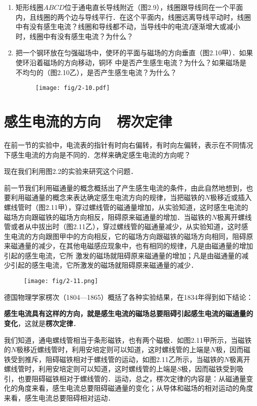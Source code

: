 \begin{enumerate}
    \item 矩形线圈$ABCD$位于通电直长导线附近（图2.9），线圈跟导线同在一个平面内，且线圈的两个边与导线平行．在这个平面内，线圈远离导线平动时，线圈中有没有感生电流？线圈和导线都不动，当导线中的电流$I$逐渐增大或减小时，线圈中有没有感生电流？为什么？
    \item 把一个钢环放在匀强磁场中，使环的平面与磁场的方向垂直（图2.10甲）．如果使环沿着磁场的方向移动，铜环
中是否产生感生电流？为什么？如果磁场是不均匀的（图2.10乙），是否产生感生电流？为什么？
\begin{figure}[htp]\centering
\texttt{[image: fig/2-10.pdf]}
\caption{}
\end{figure}
\end{enumerate}


\section{感生电流的方向~~楞次定律}
在前一节的实验中，电流表的指针有时向右偏转，有时向左偏转，表示在不同情况下感生电流的方向是不同的．怎样来确定感生电流的方向呢？

现在我们利用图2.2的实验来研究这个问题．

前一节我们利用磁通量的概念概括出了产生感生电流的条件，由此自然地想到，也要利用磁通量的概念来表达确定感生电流方向的规律，当把磁铁的$N$极移近或插入螺线管时（图2.11甲），穿过螺线管的磁通量增加，从实验知道，这时感生电流的磁场方向跟磁铁的磁场方向相反，阻碍原来磁通量的增加．当磁铁的$N$极离开螺线管或者从中拔出时（图2.11乙），穿过螺线管的磁通量减少，从实验知道，这时感生电流的方向跟图甲中的方向相反，它的磁场方向跟磁铁的磁场方向相同，阻碍原来磁通量的减少，在其他电磁感应现象中，也有相同的规律，凡是由磁通量的增加引起的感生电流，它所
激发的磁场就阻碍原来磁通量的增加；凡是由磁通量的减少引起的感生电流，它所激发的磁场就阻碍原来磁通量的减少．
\begin{figure}[htp]\centering
\texttt{[image: fig/2-11.png]}
\caption{}
\end{figure}

德国物理学家楞次（1804—1865）概括了各种实验结果，在1834年得到如下结论：

\textbf{感生电流具有这样的方向，就是感生电流的磁场总要阻碍引起感生电流的磁通量的变化}，这就是\textbf{楞次定律}．

我们知道，通电螺线管相当于条形磁铁，也有两个磁极．如图2.11甲所示，当磁铁的$N$极移近螺线管时，利用安培定则可以知道，这时螺线管的上端是$N$极，因而磁铁受到推斥，阻碍磁铁相对于螺线管的运动，如图2.11乙所示，当磁铁的$N$极离开螺线管时，利用安培定则可以知道，这时螺线管的上端是$S$极，因而磁铁受到吸引，也要阻碍磁铁相对于螺线管的．运动，总之，楞次定律的内容是：从磁通量变化的角度来看，感生电流总要阻碍磁通量的变化；从导体和磁场的相对运动的角度来看，感生电流总要阻碍相对运动．

